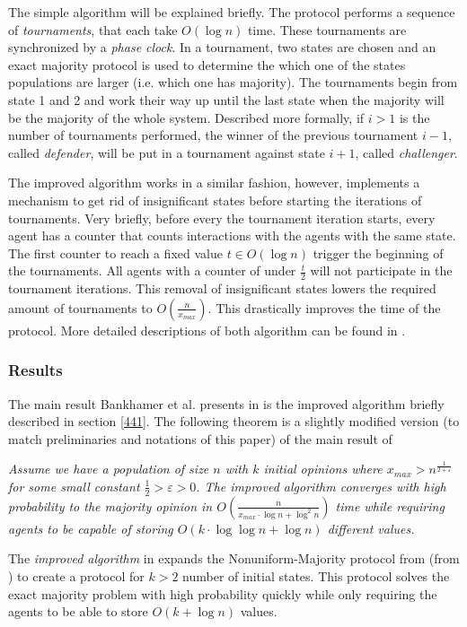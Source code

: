 The simple algorithm will be explained briefly. The protocol performs a sequence of \emph{tournaments}, that each take $O(\log n)$ time. These tournaments are synchronized by a \emph{phase clock}. In a tournament, two states are chosen and an exact majority protocol is used to determine the which one of the states populations are larger (i.e. which one has majority). The tournaments begin from state 1 and 2 and work their way up until the last state when the majority will be the majority of the whole system. Described more formally, if $i > 1$ is the number of tournaments performed, the winner of the previous tournament $i - 1$, called \emph{defender}, will be put in a tournament against state $i + 1$, called \emph{challenger}. 

The improved algorithm works in a similar fashion, however, implements a mechanism to get rid of insignificant states before starting the iterations of tournaments. Very briefly, before every the tournament iteration starts, every agent has a counter that counts interactions with the agents with the same state. The first counter to reach a fixed value $t \in O(\log n)$ trigger the beginning of the tournaments. All agents with a counter of under $\frac{t}{2}$ will not participate in the tournament iterations. This removal of insignificant states lowers the required amount of tournaments to $O(\frac{n}{x_{max}})$. This drastically improves the time of the protocol. More detailed descriptions of both algorithm can be found in \cite{bankhamerPopulationProtocolsExact2022}.

\subsubsection{Results}

The main result Bankhamer et al. presents in \cite{bankhamerPopulationProtocolsExact2022} is the improved algorithm briefly described in section \ref{441}. The following theorem is a slightly modified version (to match preliminaries and notations of this paper) of the main result of \cite{bankhamerPopulationProtocolsExact2022}

 \begin{theorem}
    \textit{
        Assume we have a population of size $n$ with $k$ initial opinions where $x_{max} > n^{\frac{1}{2 + \varepsilon}}$ for some small constant $\frac{1}{2} > \varepsilon > 0$. The \emph{improved algorithm} converges with high probability to the majority opinion in $O(\frac{n}{x_{max} \cdot \log n + \log^2 n})$ time while requiring agents to be capable of storing $O(k \cdot \log \log n + \log n)$ different values.}
 \end{theorem} 

The \emph{improved algorithm} in \cite{bankhamerPopulationProtocolsExact2022} expands the Nonuniform-Majority protocol from  (from \cite{dotyTimeSpaceOptimal2022}) to create a protocol for $k > 2$ number of initial states. This protocol solves the exact majority problem with high probability quickly while only requiring the agents to be able to store $O(k + \log n)$ values. 

